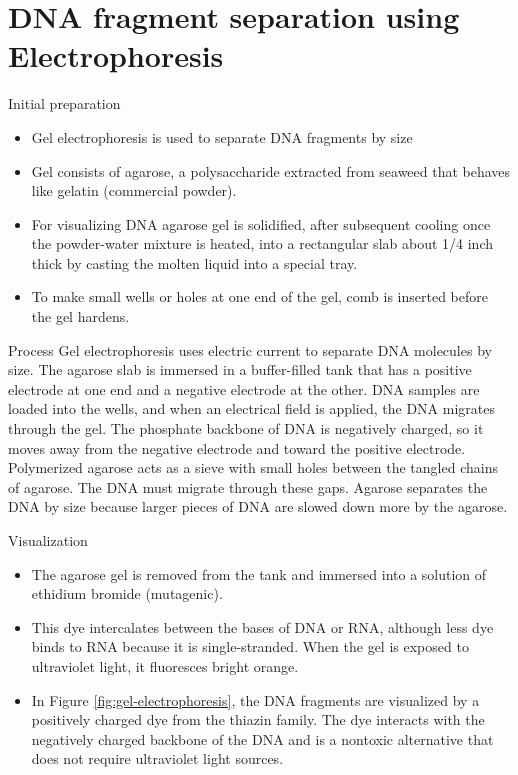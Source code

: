 \documentclass[
  ignorenonframetext,
  aspectratio=169]{beamer}
\providecommand{\tightlist}{%
  \setlength{\itemsep}{0pt}\setlength{\parskip}{0pt}}
\begin{document}
\hypertarget{dna-fragment-separation-using-electrophoresis}{%
\section{DNA fragment separation using
Electrophoresis}\label{dna-fragment-separation-using-electrophoresis}}

\begin{frame}{Initial preparation}
\protect\hypertarget{initial-preparation}{}
\begin{itemize}
\tightlist
\item
  Gel electrophoresis is used to separate DNA fragments by size
\item
  Gel consists of agarose, a polysaccharide extracted from seaweed that
  behaves like gelatin (commercial powder).
\item
  For visualizing DNA agarose gel is solidified, after subsequent
  cooling once the powder-water mixture is heated, into a rectangular
  slab about 1/4 inch thick by casting the molten liquid into a special
  tray.
\item
  To make small wells or holes at one end of the gel, comb is inserted
  before the gel hardens.
\end{itemize}
\end{frame}

\begin{frame}{Process}
\protect\hypertarget{process}{}
Gel electrophoresis uses electric current to separate DNA molecules by
size. The agarose slab is immersed in a buffer-filled tank that has a
positive electrode at one end and a negative electrode at the other. DNA
samples are loaded into the wells, and when an electrical field is
applied, the DNA migrates through the gel. The phosphate backbone of DNA
is negatively charged, so it moves away from the negative electrode and
toward the positive electrode. Polymerized agarose acts as a sieve with
small holes between the tangled chains of agarose. The DNA must migrate
through these gaps. Agarose separates the DNA by size because larger
pieces of DNA are slowed down more by the agarose.
\end{frame}

\begin{frame}{Visualization}
\protect\hypertarget{visualization}{}
\begin{itemize}
\tightlist
\item
  The agarose gel is removed from the tank and immersed into a solution
  of ethidium bromide (mutagenic).
\item
  This dye intercalates between the bases of DNA or RNA, although less
  dye binds to RNA because it is single-stranded. When the gel is
  exposed to ultraviolet light, it fluoresces bright orange.
\item
  In Figure \ref{fig:gel-electrophoresis}, the DNA fragments are
  visualized by a positively charged dye from the thiazin family. The
  dye interacts with the negatively charged backbone of the DNA and is a
  nontoxic alternative that does not require ultraviolet light sources.
\end{itemize}
\end{frame}
\end{document}
